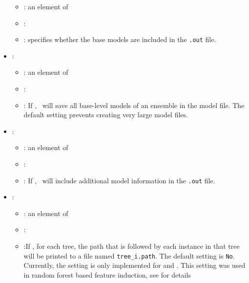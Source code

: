 \begin{itemize}
\begin{itemize}
                \item \optionPossibleValues{}: an element of  
                \item \optionDefaultValue{}: 
                \item \optionDescrption{}: specifies whether the base models are included in the \texttt{.out} file.
           \end{itemize}
    \item {}:
           \begin{itemize}
                \item \optionPossibleValues{}: an element of 
                \item \optionDefaultValue{}: 
                \item \optionDescrption{}: If , \clus\ will save all base-level models of an ensemble in the model file. The default setting prevents creating very large model files.
           \end{itemize}
    \item {}:
           \begin{itemize}
                \item \optionPossibleValues{}: an element of 
                \item \optionDefaultValue{}: 
                \item \optionDescrption{}: If , \clus\ will include additional model information in the \texttt{.out} file.
           \end{itemize}
    \item {}:
           \begin{itemize}
                \item \optionPossibleValues{}: an element of 
                \item \optionDefaultValue{}: 
                \item \optionDescrption{}:If , for each tree, the path that is followed by each instance in that tree will be printed to a file named {\tt tree\_i.path}.  The default setting is \texttt{No}. Currently, the setting is only implemented for  and . This setting was used in random forest based feature induction, see \cite{Vens2011} for details

\end{itemize}
\end{itemize}
